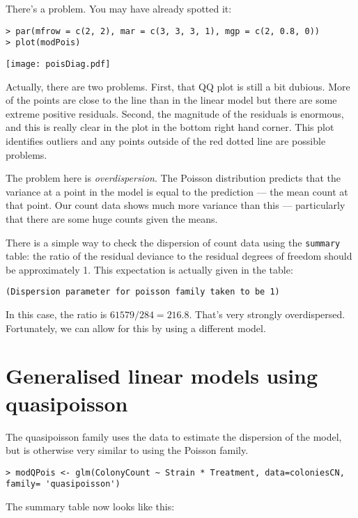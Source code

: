 There's a problem. You may have already spotted it:

\begin{lstlisting}
> par(mfrow = c(2, 2), mar = c(3, 3, 3, 1), mgp = c(2, 0.8, 0))
> plot(modPois)
\end{lstlisting}

\begin{center}
	\texttt{[image: poisDiag.pdf]}
\end{center}

Actually, there are two problems. First, that QQ plot is still a bit 
dubious. More of the points are close to the line than in the linear 
model but there are some extreme positive residuals. Second, the 
magnitude of the residuals is enormous, and this is really clear in the 
plot in the bottom right hand corner. This plot identifies outliers and 
any points outside of the red dotted line are possible problems.

The problem here is {\it overdispersion}. The Poisson distribution 
predicts that the variance at a point in the model is equal to the 
prediction --- the mean count at that point. Our count data shows much 
more variance than this --- particularly that there are some huge 
counts given the means.

There is a simple way to check the dispersion of count data using the 
{\tt summary} table: the ratio of the residual deviance to the residual 
degrees of freedom should be approximately 1. This expectation is 
actually given in the table:

{\tt (Dispersion parameter for poisson family taken to be 1)}

In this case,  the ratio is $61579/284=216.8$. That's very strongly 
overdispersed. Fortunately, we can allow for this by using a different 
model.

\section{Generalised linear models using quasipoisson}

The quasipoisson family uses the data to estimate the dispersion of the 
model, but is otherwise very similar to using the Poisson family.

\begin{lstlisting}
> modQPois <- glm(ColonyCount ~ Strain * Treatment, data=coloniesCN,
family= 'quasipoisson')
\end{lstlisting}

The summary table now looks like this:

